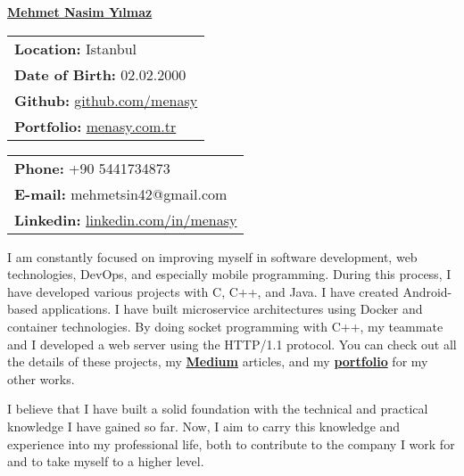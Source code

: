 \documentclass[a4paper,11pt]{article}
\begin{document}
\vspace*{-6.5em} 
\begin{center}
    \href{https://menasy.com.tr/}{\LARGE \textbf{Mehmet Nasim Yılmaz}}
\end{center}
\vspace*{0.5em} 
\noindent
\begin{minipage}[t]{0.48\textwidth}
    \begin{tabular}{@{}l}
        \textbf{Location:} Istanbul \\
        \textbf{Date of Birth:} 02.02.2000 \\
        \textbf{Github:} \href{https://github.com/menasy}{github.com/menasy} \\
        \textbf{Portfolio:} \href{https://menasy.com.tr/}{menasy.com.tr} \\
    \end{tabular}
\end{minipage}%
\hfill
\begin{minipage}[t]{0.48\textwidth}
    \raggedleft
    \begin{tabular}{@{}l}
        \textbf{Phone:} +90 5441734873 \\
        \textbf{E-mail:} mehmetsin42@gmail.com \\
        \textbf{Linkedin:} \href{https://linkedin.com/in/menasy}{linkedin.com/in/menasy} \\
    \end{tabular}
\end{minipage}

\vspace{0.7em}

I am constantly focused on improving myself in software development, web technologies, DevOps, and especially mobile programming. During this process, I have developed various projects with C, C++, and Java. I have created Android-based applications. I have built microservice architectures using Docker and container technologies. By doing socket programming with C++, my teammate and I developed a web server using the HTTP/1.1 protocol. You can check out all the details of these projects, my \textbf{\href{https://medium.com/@menasy}{Medium}} articles, and my \textbf{\href{https://menasy.com.tr/}{portfolio}} for my other works.
\vspace{-0.5em}

I believe that I have built a solid foundation with the technical and practical knowledge I have gained so far. Now, I aim to carry this knowledge and experience into my professional life, both to contribute to the company I work for and to take myself to a higher level.
\vspace{-0.5em}
\end{document}
